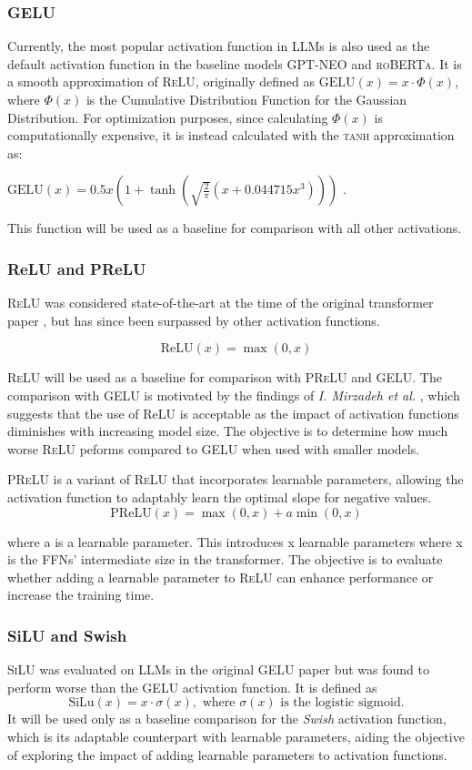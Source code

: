 \subsubsection{GELU}
Currently, the most popular activation function in LLMs is also used as the default activation function in the baseline models \textsc{GPT-NEO} and \textsc{roBERTa}. It is a smooth approximation of \textsc{ReLU}, originally defined as \(\text{GELU}(x) = x \cdot \Phi(x)\), where \(\Phi(x)\)
is the Cumulative Distribution Function for the Gaussian Distribution. For optimization purposes, since calculating \(\Phi(x)\) is computationally expensive, it is instead calculated with the \textsc{tanh} approximation as:

\(\text{GELU}(x) = 0.5x \left(1 + \tanh\left(\sqrt{\frac{2}{\pi}} \left(x + 0.044715x^3\right)\right)\right)\) \cite{Hendrycks2023}. 

This function will be used as a baseline for comparison with all other activations.

\subsubsection{ReLU and PReLU}
\textsc{ReLU} was considered state-of-the-art at the time of the original transformer paper \cite{Vaswani2017}, but has since been surpassed by other activation functions.

\[
\text{ReLU}(x) = \max(0, x)
\]

\textsc{ReLU} will be used as a baseline for comparison with \textsc{PReLU} and \textsc{GELU}. The comparison with \textsc{GELU} is motivated by the findings of \textit{I. Mirzadeh et al.} \cite{Mirzadeh2023}, which suggests that the use of ReLU is acceptable as the impact of activation functions diminishes with increasing model size. The objective is to determine how much worse \textsc{ReLU} peforms compared to \textsc{GELU} when used with smaller models.

\textsc{PReLU} is a variant of \textsc{ReLU} that incorporates learnable parameters, allowing the activation function to adaptably learn the optimal slope for negative values.
\[
\text{PReLU}(x) = \max(0, x) + a \min(0, x)
\]

where a is a learnable parameter. This introduces x learnable parameters where x is the FFNs’ intermediate size in the transformer. The objective is to evaluate whether adding a learnable parameter to \textsc{ReLU} can enhance performance or increase the training time.

\subsubsection{SiLU and Swish}
\textsc{SiLU} was evaluated on LLMs in the original \textsc{GELU} paper \cite{Hendrycks2023} but was found to perform worse than the \textsc{GELU} activation function. It is defined as 
\[
\text{SiLu}(x) = x \cdot \sigma(x), \text{ where } \sigma(x) \text{ is the logistic sigmoid.}
\]
It will be used only as a baseline comparison for the \textit{Swish} activation function, which is its adaptable counterpart with learnable parameters, aiding the objective of exploring the impact of adding learnable parameters to activation functions. 

